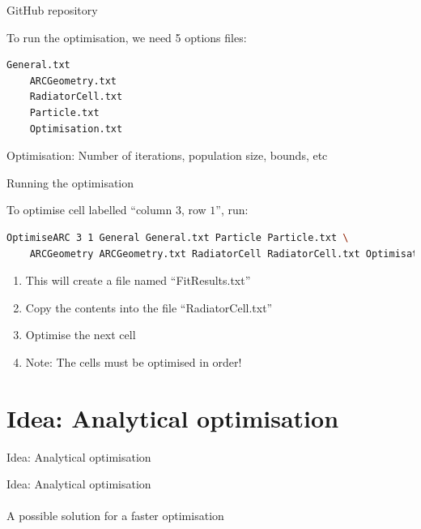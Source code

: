 \documentclass{beamer}
\begin{document}
\begin{frame}[fragile]{GitHub repository}
  \begin{center}
    To run the optimisation, we need 5 options files:
  \end{center}
  \begin{lstlisting}[language=bash, breaklines=true]
    General.txt
    ARCGeometry.txt
    RadiatorCell.txt
    Particle.txt
    Optimisation.txt
  \end{lstlisting}
  \begin{center}
    Optimisation: Number of iterations, population size, bounds, etc
  \end{center}
\end{frame}

\begin{frame}[fragile]{Running the optimisation}
  \begin{center}
    To optimise cell labelled ``column $3$, row $1$'', run:
  \end{center}
  \begin{lstlisting}[language=bash, basicstyle=\tiny]
    OptimiseARC 3 1 General General.txt Particle Particle.txt \
    ARCGeometry ARCGeometry.txt RadiatorCell RadiatorCell.txt Optimisation Optimisation.txt
  \end{lstlisting}
  \vspace{0.5cm}
  \begin{enumerate}
    \item{This will create a file named ``FitResults.txt''}
    \item{Copy the contents into the file ``RadiatorCell.txt''}
    \item{Optimise the next cell}
    \item{Note: The cells must be optimised in order!}
  \end{enumerate}
\end{frame}

\section{Idea: Analytical optimisation}
\begin{frame}{Idea: Analytical optimisation}
  \begin{center}
    {\huge Idea: Analytical optimisation} \\~\\
    {\large A possible solution for a faster optimisation}
  \end{center}
\end{frame}
\end{document}
